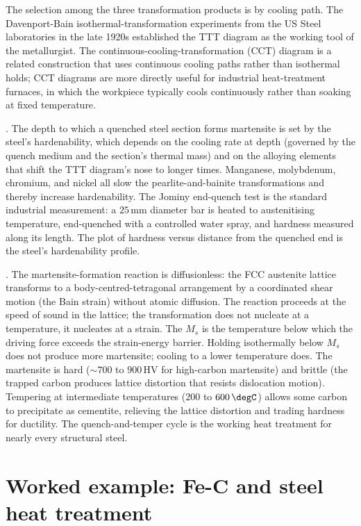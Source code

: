The selection among the three transformation products is by cooling
path. The Davenport-Bain isothermal-transformation experiments
\cite{hist:bain1939} from the US Steel laboratories in the late
1920s established the TTT diagram as the working tool of the
metallurgist. The continuous-cooling-transformation (CCT) diagram is
a related construction that uses continuous cooling paths rather than
isothermal holds; CCT diagrams are more directly useful for industrial
heat-treatment furnaces, in which the workpiece typically cools
continuously rather than soaking at fixed temperature.

. The depth to which a quenched steel section
forms martensite is set by the steel's hardenability, which depends
on the cooling rate at depth (governed by the quench medium and the
section's thermal mass) and on the alloying elements that shift the
TTT diagram's nose to longer times. Manganese, molybdenum, chromium,
and nickel all slow the pearlite-and-bainite transformations and
thereby increase hardenability. The Jominy end-quench test is the
standard industrial measurement: a $25\,\text{mm}$ diameter bar is
heated to austenitising temperature, end-quenched with a controlled
water spray, and hardness measured along its length. The plot of
hardness versus distance from the quenched end is the steel's
hardenability profile.

. The martensite-formation
reaction is diffusionless: the FCC austenite lattice transforms to a
body-centred-tetragonal arrangement by a coordinated shear motion
(the Bain strain) without atomic diffusion. The reaction proceeds at
the speed of sound in the lattice; the transformation does not
nucleate at a temperature, it nucleates at a strain. The
 $M_s$ is the temperature below
which the driving force exceeds the strain-energy barrier. Holding
isothermally below $M_s$ does not produce more martensite; cooling to
a lower temperature does. The martensite is hard ($\sim 700$ to $900\,
\text{HV}$ for high-carbon martensite) and brittle (the trapped
carbon produces lattice distortion that resists dislocation motion).
Tempering at intermediate temperatures ($200$ to $600\,\degC$) allows
some carbon to precipitate as cementite, relieving the lattice
distortion and trading hardness for ductility. The
quench-and-temper cycle is the working heat treatment for nearly
every structural steel.

\section{Worked example: Fe-C and steel heat treatment}

